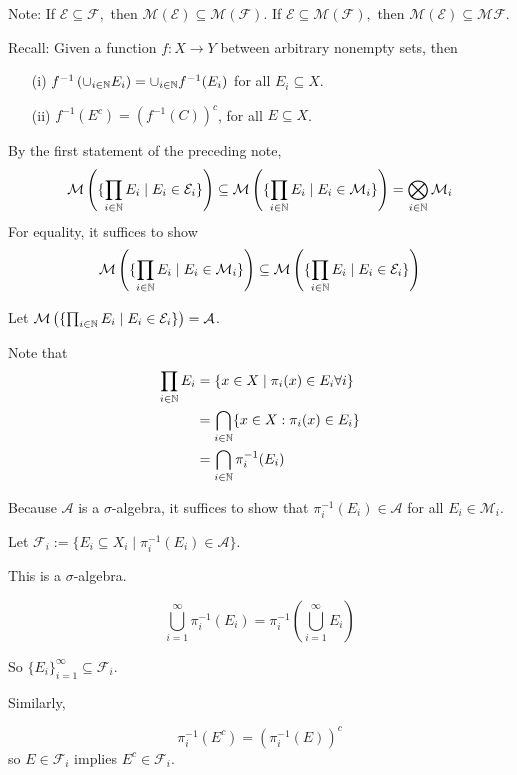 \documentclass[x11names,reqno,14pt]{extarticle}
\begin{document}
Note: If $\mathcal{E}\subseteq \mathcal{F},$ then $\mathcal{M}(\mathcal{E}) \subseteq \mathcal{M}(\mathcal{F})$. 
If $\mathcal{E} \subseteq \mathcal{M}(\mathcal{F}),$ then $\mathcal{M}(\mathcal{E}) \subseteq \mathcal{M}\mathcal{F}$.

Recall: Given a function $f:X\to Y$ between arbitrary nonempty sets, then 
\begin{itemize}
\item[(i)] $f^{-1}\left(\cup_{i\in\mathbb{N}}E_i\right) = \cup_{i\in\mathbb{N}}f^{-1}(E_i)$ for all $E_i \subseteq X$. 
\item[(ii)] $f^{-1}(E^c) = (f^{-1}(C))^c$, for all $E \subseteq X$. 
\end{itemize}

\proof By the first statement of the preceding note, 
\[
\mathcal{M}\left(\{\prod_{i\in\mathbb{N}}E_i \mid E_i \in \mathcal{E}_i\}\right) \subseteq \mathcal{M}\left(\{\prod_{i\in\mathbb{N}}E_i \mid E_i \in \mathcal{M}_i\}\right) = \bigotimes_{i\in\mathbb{N}}\mathcal{M}_i
\]
For equality, it suffices to show
\[
\mathcal{M}\left(\{\prod_{i\in\mathbb{N}}E_i \mid E_i \in \mathcal{M}_i\}\right) \subseteq \mathcal{M}\left(\{\prod_{i\in\mathbb{N}}E_i \mid E_i \in \mathcal{E}_i\}\right)
\]

Let $\mathcal{M}\left(\{\prod_{i\in\mathbb{N}}E_i \mid E_i \in \mathcal{E}_i\}\right) = \mathcal{A}$.

Note that 
\begin{align*}
\prod_{i\in\mathbb{N}}E_i  &= \{x \in X \mid \pi_i(x) \in E_i\forall i\} \\ & = \bigcap_{i\in\mathbb{N}}\{x \in X: \pi_i(x) \in E_i\} \\
 & = \bigcap_{i\in\mathbb{N}}\pi_i^{-1}(E_i) \\
\end{align*}

Because $\mathcal{A}$ is a $\sigma$-algebra, it suffices to show that $\pi_i^{-1}(E_i) \in \mathcal{A}$ for all $E_i \in \mathcal{M}_i$. 

\claim Let $\mathcal{F}_i := \{E_i \subseteq X_i \mid \pi_i^{-1}(E_i) \in \mathcal{A}\}$.

This is a $\sigma$-algebra. 

\proof

\[
\bigcup_{i=1}^\infty \pi_i^{-1}(E_i) = \pi_i^{-1}(\bigcup_{i=1}^\infty E_i)
\]

So $\{E_i\}_{i=1}^\infty \subseteq \mathcal{F}_i$. 

Similarly, 

\[
\pi_i^{-1}(E^c) = (\pi_i^{-1}(E))^c
\]
so $E \in \mathcal{F}_i$ implies $E^c \in \mathcal{F}_i$.
\end{document}
